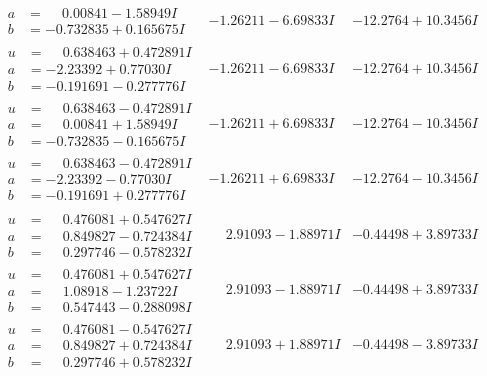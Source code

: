 \documentclass[1p]{elsarticle_modified}
\theoremstyle{definition}
\begin{document}
$$\begin{array}{c|c|c}
\begin{aligned}
a &= \phantom{-}0.00841 - 1.58949 I \\
b &= -0.732835 + 0.165675 I\end{aligned}
 & -1.26211 - 6.69833 I & -12.2764 + 10.3456 I \\ \hline\begin{aligned}
u &= \phantom{-}0.638463 + 0.472891 I \\
a &= -2.23392 + 0.77030 I \\
b &= -0.191691 - 0.277776 I\end{aligned}
 & -1.26211 - 6.69833 I & -12.2764 + 10.3456 I \\ \hline\begin{aligned}
u &= \phantom{-}0.638463 - 0.472891 I \\
a &= \phantom{-}0.00841 + 1.58949 I \\
b &= -0.732835 - 0.165675 I\end{aligned}
 & -1.26211 + 6.69833 I & -12.2764 - 10.3456 I \\ \hline\begin{aligned}
u &= \phantom{-}0.638463 - 0.472891 I \\
a &= -2.23392 - 0.77030 I \\
b &= -0.191691 + 0.277776 I\end{aligned}
 & -1.26211 + 6.69833 I & -12.2764 - 10.3456 I \\ \hline\begin{aligned}
u &= \phantom{-}0.476081 + 0.547627 I \\
a &= \phantom{-}0.849827 - 0.724384 I \\
b &= \phantom{-}0.297746 - 0.578232 I\end{aligned}
 & \phantom{-}2.91093 - 1.88971 I & -0.44498 + 3.89733 I \\ \hline\begin{aligned}
u &= \phantom{-}0.476081 + 0.547627 I \\
a &= \phantom{-}1.08918 - 1.23722 I \\
b &= \phantom{-}0.547443 - 0.288098 I\end{aligned}
 & \phantom{-}2.91093 - 1.88971 I & -0.44498 + 3.89733 I \\ \hline\begin{aligned}
u &= \phantom{-}0.476081 - 0.547627 I \\
a &= \phantom{-}0.849827 + 0.724384 I \\
b &= \phantom{-}0.297746 + 0.578232 I\end{aligned}
 & \phantom{-}2.91093 + 1.88971 I & -0.44498 - 3.89733 I \\ \hline\begin{aligned}

\end{aligned}
\end{array}$$
\end{document}

